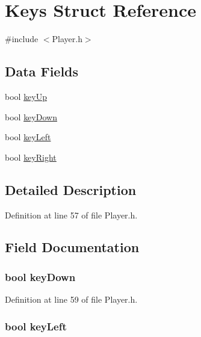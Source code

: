 \hypertarget{struct_keys}{\section{Keys Struct Reference}
\label{struct_keys}
}


{\ttfamily \#include $<$Player.\-h$>$}

\subsection*{Data Fields}
\begin{DoxyCompactItemize}
\item 
bool \hyperlink{struct_keys_a982c240b61e4c6a52ecfccd71c5efcf8}{key\-Up}
\item 
bool \hyperlink{struct_keys_ab32cbe94d09a5e97dbc09e356b235e02}{key\-Down}
\item 
bool \hyperlink{struct_keys_aefe3b9c5a3dfadb87257eec8514fe60a}{key\-Left}
\item 
bool \hyperlink{struct_keys_ab1642fe3bb4ac9580870ae4d252f997f}{key\-Right}
\end{DoxyCompactItemize}


\subsection{Detailed Description}


Definition at line 57 of file Player.\-h.



\subsection{Field Documentation}
\hypertarget{struct_keys_ab32cbe94d09a5e97dbc09e356b235e02}{
\subsubsection[{key\-Down}]{\setlength{\rightskip}{0pt plus 5cm}bool key\-Down}}\label{struct_keys_ab32cbe94d09a5e97dbc09e356b235e02}


Definition at line 59 of file Player.\-h.

\hypertarget{struct_keys_aefe3b9c5a3dfadb87257eec8514fe60a}{
\subsubsection[{key\-Left}]{\setlength{\rightskip}{0pt plus 5cm}bool key\-Left}}\label{struct_keys_aefe3b9c5a3dfadb87257eec8514fe60a}


